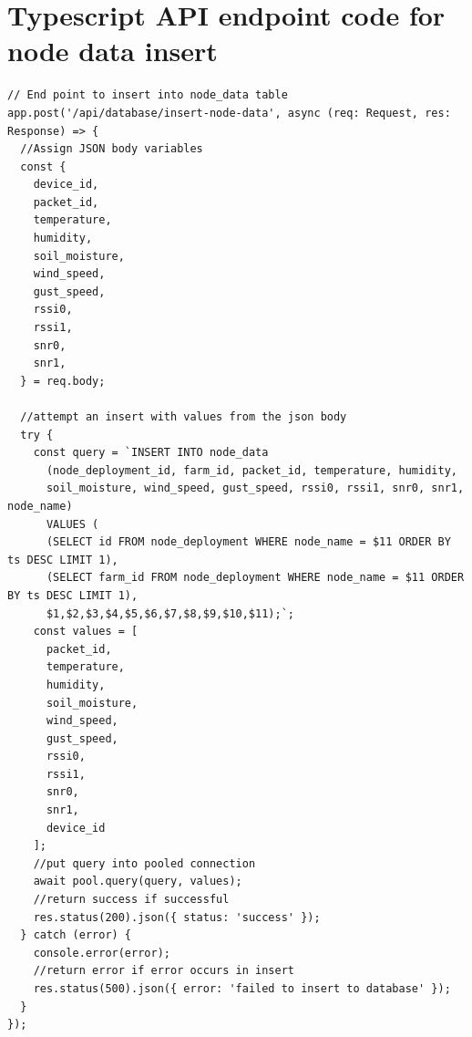 \section{Typescript API endpoint code for node data
insert}\label{app:api-endpoint}
\begin{multicols}{2}
\begin{lstlisting}
// End point to insert into node_data table
app.post('/api/database/insert-node-data', async (req: Request, res: Response) => {
  //Assign JSON body variables
  const {
    device_id,
    packet_id,
    temperature,
    humidity,
    soil_moisture,
    wind_speed,
    gust_speed,
    rssi0,
    rssi1,
    snr0,
    snr1,
  } = req.body;

  //attempt an insert with values from the json body
  try {
    const query = `INSERT INTO node_data 
      (node_deployment_id, farm_id, packet_id, temperature, humidity, 
      soil_moisture, wind_speed, gust_speed, rssi0, rssi1, snr0, snr1, node_name)
      VALUES (
      (SELECT id FROM node_deployment WHERE node_name = $11 ORDER BY ts DESC LIMIT 1),
      (SELECT farm_id FROM node_deployment WHERE node_name = $11 ORDER BY ts DESC LIMIT 1),
      $1,$2,$3,$4,$5,$6,$7,$8,$9,$10,$11);`;
    const values = [
      packet_id,
      temperature,
      humidity,
      soil_moisture,
      wind_speed,
      gust_speed,
      rssi0,
      rssi1,
      snr0,
      snr1,
      device_id
    ];
    //put query into pooled connection
    await pool.query(query, values);
    //return success if successful
    res.status(200).json({ status: 'success' });
  } catch (error) {
    console.error(error);
    //return error if error occurs in insert
    res.status(500).json({ error: 'failed to insert to database' });
  }
});

\end{lstlisting}
\end{multicols}

